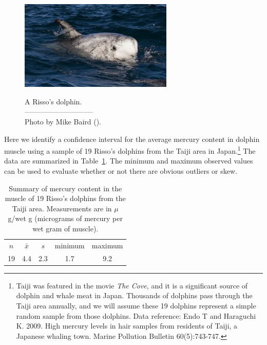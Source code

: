 \begin{figure}[h]
\centering
\includegraphics[width=0.65\textwidth]{05/figures/rissosDolphin/rissosDolphin.jpg}  \\
\addvspace{2mm}
\begin{minipage}{\textwidth}
   \caption[rissosDolphinPic]{A Risso's dolphin.\vspace{-1mm} \\
   -----------------------------\vspace{-2mm}\\
   {\footnotesize Photo by Mike Baird ().%
}\vspace{-8mm}}
   \label{rissosDolphin}
\end{minipage}
\vspace{3mm}
\end{figure}
\setlength{\captionwidth}{\mycaptionwidth}

Here we identify a confidence interval for the average mercury content in dolphin muscle using a sample of 19 Risso's dolphins from the Taiji area in Japan.\footnote{Taiji was featured in the movie \emph{The Cove}, and it is a significant source of dolphin and whale meat in Japan. Thousands of dolphins pass through the Taiji area annually, and we will assume these 19 dolphins represent a simple random sample from those dolphins. Data reference: Endo T and Haraguchi K. 2009. High mercury levels in hair samples from residents of Taiji, a Japanese whaling town. Marine Pollution Bulletin 60(5):743-747.} The data are summarized in Table~\ref{summaryStatsOfHgInMuscleOfRissosDolphins}. The minimum and maximum observed values can be used to evaluate whether or not there are obvious outliers or skew.

\begin{table}[h]
\centering
\begin{tabular}{ccc cc}
\hline
$n$ & $\bar{x}$ & $s$ & minimum & maximum \\
19   & 4.4	  & 2.3  & 1.7	       & 9.2 \\
\hline
\end{tabular}
\caption{Summary of mercury content in the muscle of 19 Risso's dolphins from the Taiji area. Measurements are in $\mu$g/wet g (micrograms of mercury per wet gram of muscle).}
\label{summaryStatsOfHgInMuscleOfRissosDolphins}
\end{table}

